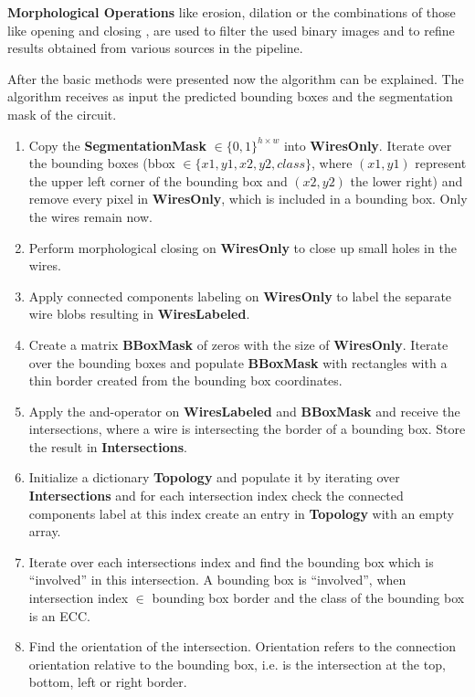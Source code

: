 \textbf{Morphological Operations} like erosion, dilation or the combinations of those like opening and closing \cite{cv}, are used to filter the used binary images and to refine results obtained from various sources in the pipeline.

After the basic methods were presented now the algorithm can be explained.
The algorithm receives as input the predicted bounding boxes and the segmentation mask of the circuit.

\begin{enumerate}
    \item Copy the \textbf{SegmentationMask} $\in \{0,1\}^{h \times w}$  into \textbf{WiresOnly}. Iterate over the bounding boxes (bbox $\in \{x1, y1, x2, y2, class\}$, where $(x1, y1)$ represent the upper left corner of the bounding box and $(x2, y2)$ the lower right) and remove every pixel in \textbf{WiresOnly}, which is included in a bounding box. Only the wires remain now.
    \item Perform morphological closing on \textbf{WiresOnly} to close up small holes in the wires.
    \item Apply connected components labeling on \textbf{WiresOnly} to label the separate wire blobs resulting in \textbf{WiresLabeled}.
    \item Create a matrix \textbf{BBoxMask} of zeros with the size of \textbf{WiresOnly}. Iterate over the bounding boxes and populate \textbf{BBoxMask} with rectangles with a thin border created from the bounding box coordinates.
    \item Apply the and-operator on \textbf{WiresLabeled} and \textbf{BBoxMask} and receive the intersections, where a wire is intersecting the border of a bounding box. Store the result in \textbf{Intersections}.
    \item Initialize a dictionary \textbf{Topology} and populate it by iterating over \textbf{Intersections} and for each intersection index check the connected components label at this index create an entry in \textbf{Topology} with an empty array.
    \item Iterate over each intersections index and find the bounding box which is ``involved'' in this intersection. A bounding box is ``involved'', when intersection index $\in$ bounding box border and the class of the bounding box is an \ac{ECC}.
    \item Find the orientation of the intersection. Orientation refers to the connection orientation relative to the bounding box, i.e. is the intersection at the top, bottom, left or right border.

\end{enumerate}
